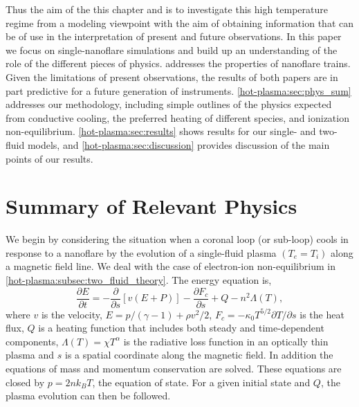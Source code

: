 Thus the aim of the this chapter and \citet[ hereafter]{barnes_inference_2016-1} is to investigate this high temperature regime from a modeling viewpoint with the aim of obtaining information that can be of use in the interpretation of present and future observations. In this paper we focus on single-nanoflare simulations and build up an understanding of the role of the different pieces of physics.  addresses the properties of nanoflare trains. Given the limitations of present observations, the results of both papers are in part predictive for a future generation of instruments. \autoref{hot-plasma:sec:phys_sum} addresses our methodology, including simple outlines of the physics expected from conductive cooling, the preferred heating of different species, and ionization non-equilibrium. \autoref{hot-plasma:sec:results} shows results for our single- and two-fluid models, and \autoref{hot-plasma:sec:discussion} provides discussion of the main points of our results.

\section{Summary of Relevant Physics}\label{hot-plasma:sec:phys_sum}

We begin by considering the situation when a coronal loop (or sub-loop) cools in response to a nanoflare by the evolution of a single-fluid plasma $(T_e = T_i)$ along a magnetic field line. We deal with the case of electron-ion non-equilibrium in  \autoref{hot-plasma:subsec:two_fluid_theory}. The energy equation is,
\begin{equation}\label{hot-plasma:eq:energy_1d}
    \frac{\partial E}{\partial t} = -\frac{\partial}{\partial s}[v(E+P)] - \frac{\partial F_c}{\partial s} + Q - n^2\Lambda(T),
\end{equation}
where $v$ is the velocity, $E=p/(\gamma -1) + \rho v^2/2$, $F_c=-\kappa_0 T^{5/2}\partial T/\partial s$ is the heat flux, $Q$ is a heating function that includes both steady and time-dependent components, $\Lambda(T)=\chi T^{\alpha}$ is the radiative loss function in an optically thin plasma \citep[e.g.][]{klimchuk_highly_2008} and $s$ is a spatial coordinate along the magnetic field. In addition the equations of mass and momentum conservation are solved. These equations are closed by $p=2nk_BT$, the equation of state. For a given initial state and $Q$, the plasma evolution can then be followed.

